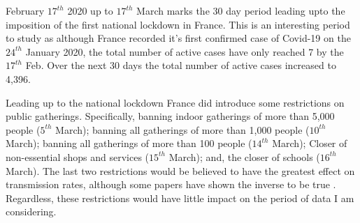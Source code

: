 \documentclass[11pt,a4paper]{article}
\theoremstyle{break}
\begin{document}
  \par February $17^{th}$ 2020 up to $17^{th}$ March marks the 30 day period leading upto the imposition of the first national lockdown in France. This is an interesting period to study as although France recorded it's first confirmed case of Covid-19 on the $24^{th}$ January 2020, the total number of active cases have only reached 7 by the $17^{th}$ Feb. Over the next 30 days the total number of active cases increased to 4,396.

  \par Leading up to the national lockdown France did introduce some restrictions on public gatherings. Specifically, banning indoor gatherings of more than 5,000 people ($5^{th}$ March); banning all gatherings of more than 1,000 people ($10^{th}$ March); banning all gatherings of more than 100 people ($14^{th}$ March); Closer of non-essential shops and services ($15^{th}$ March); and, the closer of schools ($16^{th}$ March). The last two restrictions would be believed to have the greatest effect on transmission rates, although some papers have shown the inverse to be true \cite[]{effect_of_school_closures_on_mortality}. Regardless, these restrictions would have little impact on the period of data I am considering.
\end{document}
